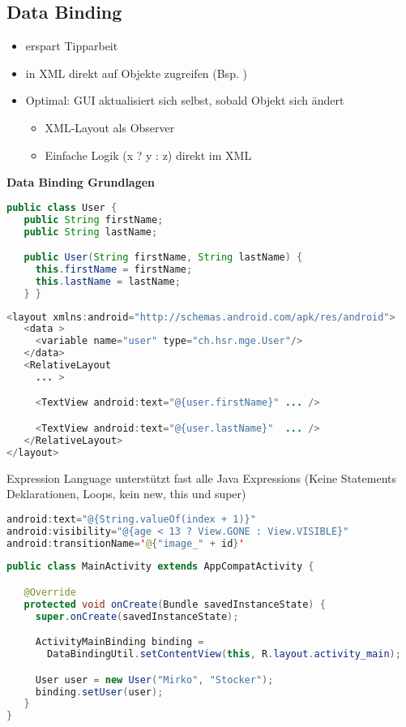 \subsection{Data Binding}
\begin{itemize}
    \item erspart Tipparbeit
    \item in XML direkt auf Objekte zugreifen (Bsp. )
    \item Optimal: GUI aktualisiert sich selbst, sobald Objekt sich ändert
    \begin{itemize}
        \item XML-Layout als Observer
        \item Einfache Logik (x ? y : z) direkt im XML
    \end{itemize}
\end{itemize}
\textbf{Data Binding Grundlagen}
\begin{lstlisting}[language=java]
public class User {
   public String firstName;
   public String lastName;

   public User(String firstName, String lastName) {
     this.firstName = firstName;
     this.lastName = lastName;
   } }
\end{lstlisting}
\begin{lstlisting}[language=java]
<layout xmlns:android="http://schemas.android.com/apk/res/android">
   <data >
     <variable name="user" type="ch.hsr.mge.User"/>
   </data>
   <RelativeLayout
     ... >

     <TextView android:text="@{user.firstName}" ... />

     <TextView android:text="@{user.lastName}"  ... />
   </RelativeLayout>
</layout>
\end{lstlisting}
Expression Language unterstützt fast alle Java Expressions (Keine Statements Deklarationen, Loops, kein new, this und super)
\begin{lstlisting}[language=java]
android:text="@{String.valueOf(index + 1)}"
android:visibility="@{age < 13 ? View.GONE : View.VISIBLE}"
android:transitionName='@{"image_" + id}'
\end{lstlisting}
\begin{lstlisting}[language=java]
public class MainActivity extends AppCompatActivity {

   @Override
   protected void onCreate(Bundle savedInstanceState) {
     super.onCreate(savedInstanceState);

     ActivityMainBinding binding = 
       DataBindingUtil.setContentView(this, R.layout.activity_main);

     User user = new User("Mirko", "Stocker");
     binding.setUser(user);
   }
}
\end{lstlisting}
